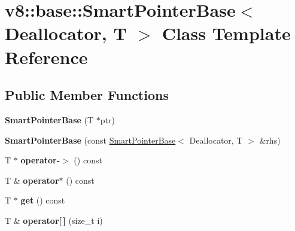 \hypertarget{classv8_1_1base_1_1_smart_pointer_base}{}\section{v8\+:\+:base\+:\+:Smart\+Pointer\+Base$<$ Deallocator, T $>$ Class Template Reference}
\label{classv8_1_1base_1_1_smart_pointer_base}
\subsection*{Public Member Functions}
\begin{DoxyCompactItemize}
\item 
{\bfseries Smart\+Pointer\+Base} (T $\ast$ptr)\hypertarget{classv8_1_1base_1_1_smart_pointer_base_aeb6fa514edd4e51fd8e18295f6a135bc}{}\label{classv8_1_1base_1_1_smart_pointer_base_aeb6fa514edd4e51fd8e18295f6a135bc}

\item 
{\bfseries Smart\+Pointer\+Base} (const \hyperlink{classv8_1_1base_1_1_smart_pointer_base}{Smart\+Pointer\+Base}$<$ Deallocator, T $>$ \&rhs)\hypertarget{classv8_1_1base_1_1_smart_pointer_base_a7b401e834516ed93f26cd5c7ee12fa17}{}\label{classv8_1_1base_1_1_smart_pointer_base_a7b401e834516ed93f26cd5c7ee12fa17}

\item 
T $\ast$ {\bfseries operator-\/$>$} () const \hypertarget{classv8_1_1base_1_1_smart_pointer_base_a4e40f80c090ea9295bd8b9159e4ceb88}{}\label{classv8_1_1base_1_1_smart_pointer_base_a4e40f80c090ea9295bd8b9159e4ceb88}

\item 
T \& {\bfseries operator$\ast$} () const \hypertarget{classv8_1_1base_1_1_smart_pointer_base_a7d82e596760bc845a6a59dd33b4be2bd}{}\label{classv8_1_1base_1_1_smart_pointer_base_a7d82e596760bc845a6a59dd33b4be2bd}

\item 
T $\ast$ {\bfseries get} () const \hypertarget{classv8_1_1base_1_1_smart_pointer_base_a8fb3ed68714da5e2e4814a2b507ea47c}{}\label{classv8_1_1base_1_1_smart_pointer_base_a8fb3ed68714da5e2e4814a2b507ea47c}

\item 
T \& {\bfseries operator\mbox{[}$\,$\mbox{]}} (size\+\_\+t i)\hypertarget{classv8_1_1base_1_1_smart_pointer_base_a88d6a816c892459c1d8e554a67c0c19d}{}\label{classv8_1_1base_1_1_smart_pointer_base_a88d6a816c892459c1d8e554a67c0c19d}


\end{DoxyCompactItemize}
